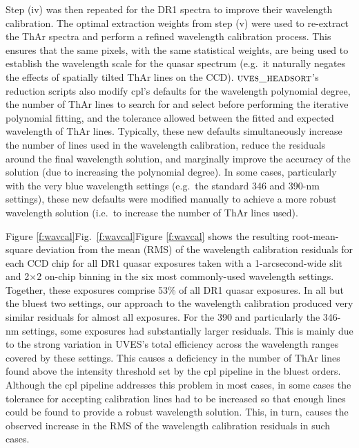 \documentclass[fleqn,usenatbib,usedcolumn]{mnras}
\newcommand{\Fref}[1]{\ifhmode \ifnum\spacefactor=1001 Figure \ref{#1}\else Fig.\ \ref{#1}\fi \else Figure \ref{#1}\fi}
\newcommand{\headsort}{\ensuremath{\textsc{uves\_headsort}}}
\begin{document}
Step (iv) was then repeated for the DR1 spectra to improve their wavelength calibration. The optimal extraction weights from step (v) were used to re-extract the ThAr spectra and perform a refined wavelength calibration process. This ensures that the same pixels, with the same statistical weights, are being used to establish the wavelength scale for the quasar spectrum (e.g.\ it naturally negates the effects of spatially tilted ThAr lines on the CCD). \headsort's reduction scripts also modify {\sc cpl}'s defaults for the wavelength polynomial degree, the number of ThAr lines to search for and select before performing the iterative polynomial fitting, and the tolerance allowed between the fitted and expected wavelength of ThAr lines. Typically, these new defaults simultaneously increase the number of lines used in the wavelength calibration, reduce the residuals around the final wavelength solution, and marginally improve the accuracy of the solution (due to increasing the polynomial degree). In some cases, particularly with the very blue wavelength settings (e.g.\ the standard 346 and 390-nm settings), these new defaults were modified manually to achieve a more robust wavelength solution (i.e.\ to increase the number of ThAr lines used).

\Fref{f:wavcal} shows the resulting root-mean-square deviation from the mean (RMS) of the wavelength calibration residuals for each CCD chip for all DR1 quasar exposures taken with a 1-arcsecond-wide slit and 2$\times$2 on-chip binning in the six most commonly-used wavelength settings. Together, these exposures comprise 53\% of all DR1 quasar exposures. In all but the bluest two settings, our approach to the wavelength calibration produced very similar residuals for almost all exposures. For the 390 and particularly the 346-nm settings, some exposures had substantially larger residuals. This is mainly due to the strong variation in UVES's total efficiency across the wavelength ranges covered by these settings. This causes a deficiency in the number of ThAr lines found above the intensity threshold set by the {\sc cpl} pipeline in the bluest orders. Although the {\sc cpl} pipeline addresses this problem in most cases, in some cases the tolerance for accepting calibration lines had to be increased so that enough lines could be found to provide a robust wavelength solution. This, in turn, causes the observed increase in the RMS of the wavelength calibration residuals in such cases.
\end{document}
